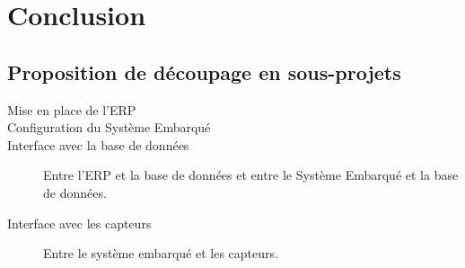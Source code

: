 \section{Conclusion}



\subsection{Proposition de découpage en sous-projets}

\begin{description}
\item[Mise en place de l'ERP] 
\item[Configuration du Système Embarqué] 
\item[Interface avec la base de données] Entre l'ERP et la base de données et 
entre le Système Embarqué et la base de données.
\item[Interface avec les capteurs] Entre le système embarqué et les capteurs.
\end{description}

